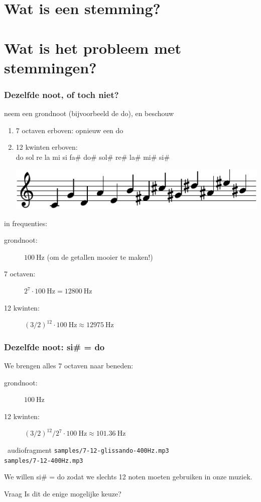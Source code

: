 \documentclass[compress, darktitle, framenumber, totalframenumber]{beamer}
\begin{document}
\section{Wat is een stemming?}

\section{Wat is het probleem met stemmingen?}

\begin{frame}
  \frametitle{Dezelfde noot, of toch niet?}

  neem een grondnoot (bijvoorbeeld de do), en beschouw
  \begin{enumerate}
    \item 7 octaven erboven: opnieuw een do
      \pause
    \item 12 kwinten erboven: \\
      do sol re la mi si fa\# do\# sol\# re\# la\# mi\# si\#

      \includegraphics{scores/circle-cropped}
  \end{enumerate}
  \pause
  in frequenties:
  \begin{description}
    \item[grondnoot:] $\SI{100}{\hertz}$ (om de getallen mooier te maken!)
    \item[7 octaven:] $2^7\cdot\SI{100}{\hertz}=\SI{12800}{\hertz}$ 
      \pause
    \item[12 kwinten:] $(3/2)^{12}\cdot\SI{100}{\hertz}\approx\SI{12975}{\hertz}$
  \end{description}
\end{frame}

\begin{frame}
  \frametitle{Dezelfde noot: si\# = do}

  We brengen alles 7 octaven naar beneden:
  \begin{description}
    \item[grondnoot:] $\SI{100}{\hertz}$
    \item[12 kwinten:] $(3/2)^{12}/2^7\cdot\SI{100}{\hertz}\approx\SI{101.36}{\hertz}$
  \end{description}
  \pause
  \begin{block}{\twonotes\ audiofragment}
    \texttt{samples/7-12-glissando-400Hz.mp3} \\
    \texttt{samples/7-12-400Hz.mp3}
  \end{block}
  \pause
  We willen si\# = do zodat we slechts 12 noten moeten gebruiken in onze muziek.

  \begin{alertblock}{Vraag}
    Is dit de enige mogelijke keuze?
  \end{alertblock}
\end{frame}
\end{document}
